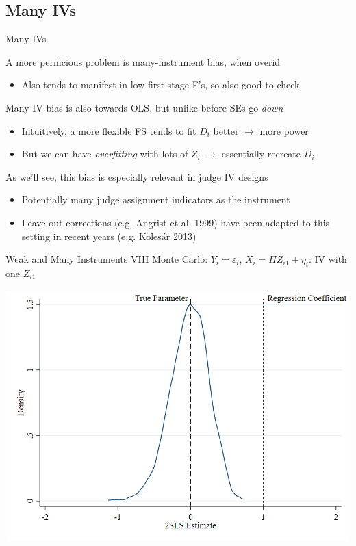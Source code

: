 \documentclass{beamer}
\begin{document}
\subsection{Many IVs}
\begin{frame}{Many IVs}

A more pernicious problem is many-instrument bias, when overid\smallskip
\begin{itemize}
  \item Also tends to manifest in low first-stage F's, so also good to check
\end{itemize}\bigskip\pause{}

Many-IV bias is also towards OLS, but unlike before SEs go \emph{down}\smallskip
\begin{itemize}
  \item Intuitively, a more flexible FS tends to fit $D_i$ better $\rightarrow$ more power\smallskip
  \item But we can have \emph{overfitting} with lots of $Z_i$ $\rightarrow$ essentially recreate $D_i$
\end{itemize}\bigskip\pause{}

As we'll see, this bias is especially relevant in judge IV designs\smallskip
\begin{itemize}
  \item Potentially many judge assignment indicators as the instrument\smallskip
  \item Leave-out corrections (e.g. Angrist et al. 1999) have been adapted to this setting in recent years (e.g. Koles\'{a}r 2013)
\end{itemize}

\end{frame}

\begin{frame}{Weak and Many Instruments VIII}
\vspace{-0.2cm}
Monte Carlo: $Y_i=\varepsilon_i$, $X_i=\Pi Z_{i1}+\eta_i$: IV with one $Z_{i1}$
\begin{center}
\includegraphics[scale=0.35]{./lecture_includes/fewz.png}
\end{center}

\end{frame}
\end{document}
